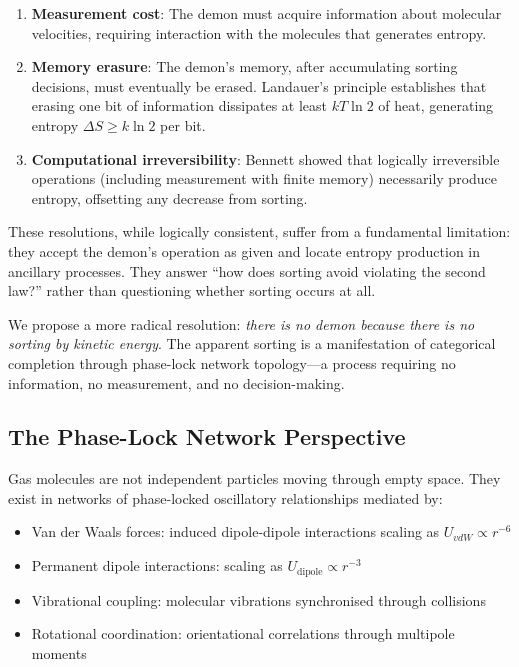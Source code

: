 \documentclass[12pt,a4paper]{article}
\theoremstyle{definition}
\theoremstyle{remark}
\begin{document}
\begin{enumerate}
    \item \textbf{Measurement cost}: The demon must acquire information about molecular velocities, requiring interaction with the molecules that generates entropy.

    \item \textbf{Memory erasure}: The demon's memory, after accumulating sorting decisions, must eventually be erased. Landauer's principle establishes that erasing one bit of information dissipates at least $kT \ln 2$ of heat, generating entropy $\Delta S \geq k \ln 2$ per bit.

    \item \textbf{Computational irreversibility}: Bennett showed that logically irreversible operations (including measurement with finite memory) necessarily produce entropy, offsetting any decrease from sorting.
\end{enumerate}

These resolutions, while logically consistent, suffer from a fundamental limitation: they accept the demon's operation as given and locate entropy production in ancillary processes. They answer ``how does sorting avoid violating the second law?'' rather than questioning whether sorting occurs at all.

We propose a more radical resolution: \textit{there is no demon because there is no sorting by kinetic energy}. The apparent sorting is a manifestation of categorical completion through phase-lock network topology---a process requiring no information, no measurement, and no decision-making.

\subsection{The Phase-Lock Network Perspective}

Gas molecules are not independent particles moving through empty space. They exist in networks of phase-locked oscillatory relationships mediated by:
\begin{itemize}
    \item Van der Waals forces: induced dipole-dipole interactions scaling as $U_{vdW} \propto r^{-6}$
    \item Permanent dipole interactions: scaling as $U_{\text{dipole}} \propto r^{-3}$
    \item Vibrational coupling: molecular vibrations synchronised through collisions
    \item Rotational coordination: orientational correlations through multipole moments
\end{itemize}
\end{document}
